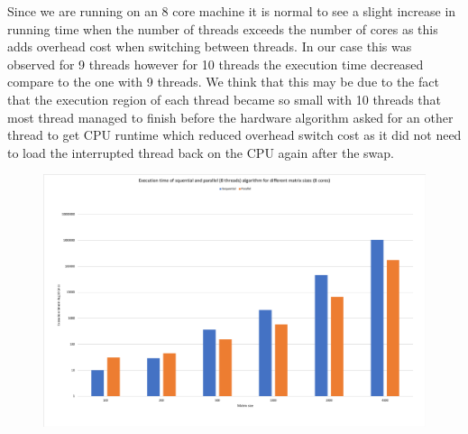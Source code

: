 \documentclass[11pt,letterpaper]{exam}
\begin{document}
\begin{questions}
			\quad Since we are running on an 8 core machine it is normal to see a slight increase in running time when the number of threads exceeds the number of cores as this adds overhead cost when switching between threads. In our case this was observed for 9 threads however for 10 threads the execution time decreased compare to the one with 9 threads. We think that this may be due to the fact that the execution region of each thread became so small with 10 threads that most thread managed to finish before the hardware algorithm asked for an other thread to get CPU runtime which reduced overhead switch cost as it did not need to load the interrupted thread back on the CPU again after the swap.			
			\begin{figure}[h!]
				\centering
				\includegraphics[scale=0.4]{ExectionParallelSequential}
			\end{figure}
		

\end{questions}
\end{document}
